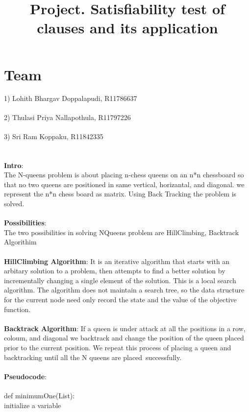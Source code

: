 \documentclass[12pt, letterpaper]{article}
\newcommand{\projecttitle} {
  Satisfiability test of clauses and its application
}
\begin{document}
\title{{\bf Project.} \projecttitle}
\date{} 
 \maketitle


\section*{Team}
1) Lohith Bhargav Doppalapudi, R11786637 \\
   \\
2) Thulasi Priya Nallapothula,    R11797226 \\
   \\
3) Sri Ram Koppaku,     R11842335\\
   \\ \\
\textbf{Intro}:\\
The N-queens problem is about placing n-chess queens on an n*n chessboard so that no two queens are positioned in same vertical, horizantal, and diagonal. we represent the n*n chess board as matrix. Using Back Tracking the problem is solved.\\
\\
\textbf{Possibilities}:\\
The two possibilities in solving NQueens problem are HillClimbing, Backtrack Algorithim\\
\\
\textbf{HillClimbing Algorithm}: It is an iterative algorithm that starts with an arbitary solution to a problem, then attempts to find a better solution by incrementally changing a single element of the solution. This is a local search algorithm. The algorithm does not maintain a search tree, so the data structure for the current node need only record the state and the value of the objective function.\\
\\
\textbf{Backtrack Algorithm}: If a queen is under attack at all the positions in a row, coloum, and diagonal we backtrack and change the position of the queen placed prior to the current position. We repeat this process of placing a queen and backtracking until all the N queens are placed successfully.\\
\\ \textbf{Pseudocode}:\\
\\def minimumOne(List):\\
\indent   initialize a variable\\
\end{document}
